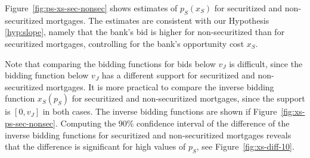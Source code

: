 \documentclass[11pt,twopage]{article}
\begin{document}
Figure~\ref{fig:ps-xs-sec-nonsec} shows estimates of $p_S(x_S)$ for
securitized and non-securitized mortgages. The estimates are
consistent with our Hypothesis \ref{hyp:slope}, namely that the bank's
bid is higher for non-securitized than for securitized mortgages,
controlling for the bank's opportunity cost $x_S$.

Note that comparing the bidding functions for bids below $v_J$ is
difficult, since the bidding function below $v_J$ has a different
support for securitized and non-securitized mortgages. It is more
practical to compare the inverse bidding function $x_S(p_S)$ for
securitized and non-securitized mortgages, since the support is
$[0,v_J]$ in both cases. The inverse bidding functions are shown if
Figure~\ref{fig:xs-ps-sec-nonsec}. Computing the 90\% confidence
interval of the difference of the inverse bidding functions for
securitized and non-securitized mortgages reveals that the difference
is significant for high values of $p_S$, see
Figure~\ref{fig:xs-diff-10}.
\end{document}
